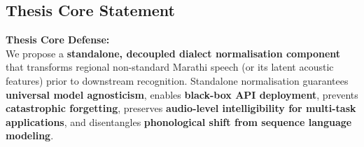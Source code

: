 \documentclass[11pt]{article}
\begin{document}
\subsection{Thesis Core Statement}
\begin{infobox}
\textbf{Thesis Core Defense:} \\
We propose a \textbf{standalone, decoupled dialect normalisation component} that transforms regional non-standard Marathi speech (or its latent acoustic features) prior to downstream recognition. Standalone normalisation guarantees \textbf{universal model agnosticism}, enables \textbf{black-box API deployment}, prevents \textbf{catastrophic forgetting}, preserves \textbf{audio-level intelligibility for multi-task applications}, and disentangles \textbf{phonological shift from sequence language modeling}.
\end{infobox}
\end{document}
